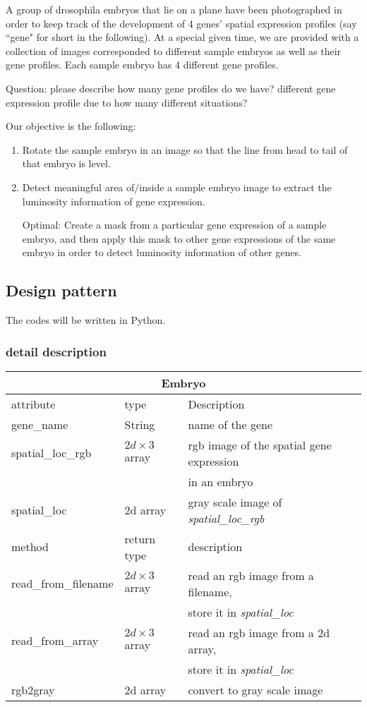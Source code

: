 \documentclass[a4paper,12pt]{article}
\numberwithin{equation}{section}
\begin{document}
	A group of drosophila embryos that lie on a plane have been photographed in order to keep track of the development of 4 genes' spatial expression profiles (say ``gene" for short in the following). At a special given time, we are provided with a collection of images corresponded to different sample embryos as well as their gene profiles. Each sample embryo has 4 different gene profiles.
	
	{\color{red} Question: please describe how many gene profiles do we have? different gene expression profile due to how many different situations? }
	
	Our objective is the following: 
	\begin{enumerate}
		\item Rotate the sample embryo in an image so that the line from head to tail of that embryo is level.
		\item Detect meaningful area of/inside a sample embryo image to extract the luminosity information of gene expression.
		\item [Optimal:] Create a mask from a particular gene expression of a sample embryo, and then apply this mask to other gene expressions of the same embryo in order to detect luminosity information of other genes.
	\end{enumerate} 
	
	\subsection{Design pattern}
	The codes will be written in Python. 
	
	\subsubsection{detail description}
	
	\begin{tabular}{ l  l| l}	
		\multicolumn{3}{c}{Embryo}\\
		\hline
		attribute &  type & Description\\
		\hline \hline
		gene\_name & String & name of the gene\\
		spatial\_loc\_rgb & $2d\times3$ array & rgb image of the spatial gene expression\\
		&& in an embryo\\
		spatial\_loc & 2d array & gray scale image of \textit{spatial\_loc\_rgb}\\
		\hline\hline
		method & return type & description\\
		\hline
		read\_from\_filename & $2d \times 3$ array & read an rgb image from a filename,\\
		&& store it in \textit{spatial\_loc} \\
		read\_from\_array & $2d \times 3$ array & read an rgb image from a 2d array,\\
		&& store it in  \textit{spatial\_loc}\\
		rgb2gray &  2d array & convert to gray scale image\\
		\hline
	\end{tabular}
	
\end{document}
